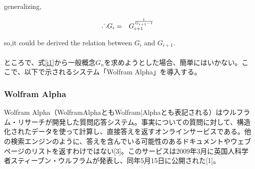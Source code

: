 generalizing,

\begin{eqnarray}
\raisebox{.2ex}{.}\raisebox{1.2ex}{.}\raisebox{.2ex}{.} G_{i}&=&G_{i+1}^{\frac{1}{G_{i+1}-1}}
 \label{i1}
 \end{eqnarray}

so,it could be  derived the relation between $G_{i}$ and $G_{i+1}$.\\
\\
ところで、式\ref{i1}から一般概念$G_{n}$を求めようとした場合、簡単にはいかない。ここで、以下で示されるシステム「Wolfram Alpha」を導入する。\\

\newpage
\subsubsection{Wolfram Alpha}
Wolfram Alpha（WolframAlphaともWolfram|Alphaとも表記される）はウルフラム・リサーチが開発した質問応答システム。事実についての質問に対して、構造化されたデータを使って計算し、直接答えを返すオンラインサービスである。他の検索エンジンのように、答えを含んでいる可能性のあるドキュメントやウェブページのリストを返すわけではない[3]。このサービスは2009年3月に英国人科学者スティーブン・ウルフラムが発表し、同年5月15日に公開された[1]。
